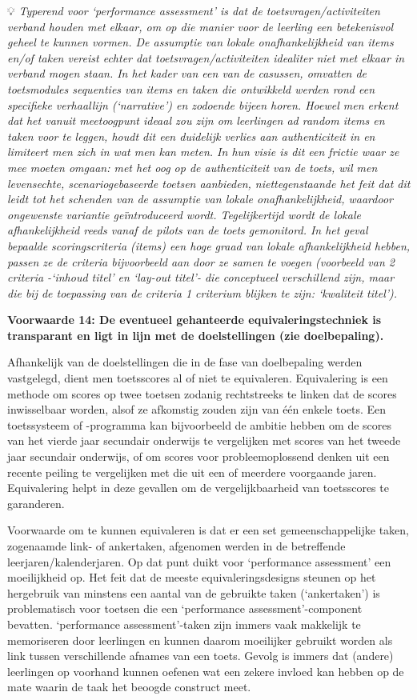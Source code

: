\documentclass[
  letterpaper,
]{report}
\begin{document}
💡 \emph{Typerend voor `performance assessment' is dat de
toetsvragen/activiteiten verband houden met elkaar, om op die manier
voor de leerling een betekenisvol geheel te kunnen vormen. De assumptie
van lokale onafhankelijkheid van items en/of taken vereist echter dat
toetsvragen/activiteiten idealiter niet met elkaar in verband mogen
staan. In het kader van een van de casussen, omvatten de toetsmodules
sequenties van items en taken die ontwikkeld werden rond een specifieke
verhaallijn (`narrative') en zodoende bijeen horen. Hoewel men erkent
dat het vanuit meetoogpunt ideaal zou zijn om leerlingen ad random items
en taken voor te leggen, houdt dit een duidelijk verlies aan
authenticiteit in en limiteert men zich in wat men kan meten. In hun
visie is dit een frictie waar ze mee moeten omgaan: met het oog op de
authenticiteit van de toets, wil men levensechte, scenariogebaseerde
toetsen aanbieden, niettegenstaande het feit dat dit leidt tot het
schenden van de assumptie van lokale onafhankelijkheid, waardoor
ongewenste variantie geïntroduceerd wordt. Tegelijkertijd wordt de
lokale afhankelijkheid reeds vanaf de pilots van de toets gemonitord. In
het geval bepaalde scoringscriteria (items) een hoge graad van lokale
afhankelijkheid hebben, passen ze de criteria bijvoorbeeld aan door ze
samen te voegen (voorbeeld van 2 criteria -`inhoud titel' en `lay-out
titel'- die conceptueel verschillend zijn, maar die bij de toepassing
van de criteria 1 criterium blijken te zijn: `kwaliteit titel').}

\textbf{Voorwaarde 14: De eventueel gehanteerde equivaleringstechniek is
transparant en ligt in lijn met de doelstellingen (zie doelbepaling).}

Afhankelijk van de doelstellingen die in de fase van doelbepaling werden
vastgelegd, dient men toetsscores al of niet te equivaleren.
Equivalering is een methode om scores op twee toetsen zodanig
rechtstreeks te linken dat de scores inwisselbaar worden, alsof ze
afkomstig zouden zijn van één enkele toets. Een toetssysteem of
-programma kan bijvoorbeeld de ambitie hebben om de scores van het
vierde jaar secundair onderwijs te vergelijken met scores van het tweede
jaar secundair onderwijs, of om scores voor probleemoplossend denken uit
een recente peiling te vergelijken met die uit een of meerdere
voorgaande jaren. Equivalering helpt in deze gevallen om de
vergelijkbaarheid van toetsscores te garanderen.

Voorwaarde om te kunnen equivaleren is dat er een set gemeenschappelijke
taken, zogenaamde link- of ankertaken, afgenomen werden in de
betreffende leerjaren/kalenderjaren. Op dat punt duikt voor `performance
assessment' een moeilijkheid op. Het feit dat de meeste
equivaleringsdesigns steunen op het hergebruik van minstens een aantal
van de gebruikte taken (`ankertaken') is problematisch voor toetsen die
een `performance assessment'-component bevatten. `performance
assessment'-taken zijn immers vaak makkelijk te memoriseren door
leerlingen en kunnen daarom moeilijker gebruikt worden als link tussen
verschillende afnames van een toets. Gevolg is immers dat (andere)
leerlingen op voorhand kunnen oefenen wat een zekere invloed kan hebben
op de mate waarin de taak het beoogde construct meet.
\end{document}
